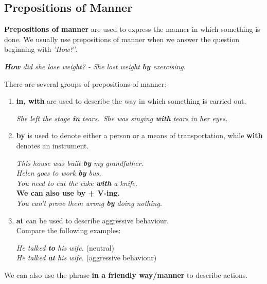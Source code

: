 \documentclass[hidelinks,10pt,a4paper]{article}
\begin{document}
\subsection{Prepositions of Manner}

\textbf{Prepositions of manner} are used to express the manner in which something is done. We usually use prepositions of manner when we answer the question beginning with \textit{'How?'}.

\begin{center}
	\textit{\textbf{How} did she lose weight? - She lost weight \textbf{by} exercising.}
\end{center}

There are several groups of prepositions of manner:
\begin{enumerate}[label=(\alph*)]
	\item \textbf{in, with} are used to describe the way in which something is carried out. \\
		\begin{center}
			\textit{She left the stage \textbf{in} tears.\
			She was singing \textbf{with} tears in her eyes.}
		\end{center}
	\item \textbf{by} is used to denote either a person or a means of transportation, while \textbf{with} denotes an instrument.
		\begin{center}
			\textit{This house was built \textbf{by} my grandfather.}\\
			\textit{Helen goes to work \textbf{by} bus.} \\
			\textit{You need to cut the cake \textbf{with} a knife. }\\
			\textbf{We can also use by + V-ing.}\\
			\textit{You can't prove them wrong \textbf{by} doing nothing.}
		\end{center}
	\item \textbf{at} can be used to describe aggressive behaviour.\\
		Compare the following examples:
		\begin{center}
			\textit{He talked \textbf{to} his wife.} (neutral)\\
			\textit{He talked \textbf{at} his wife.} (aggressive behaviour)
		\end{center}
\end{enumerate}

We can also use the phrase \textbf{in a friendly way/manner} to describe actions.
\end{document}
